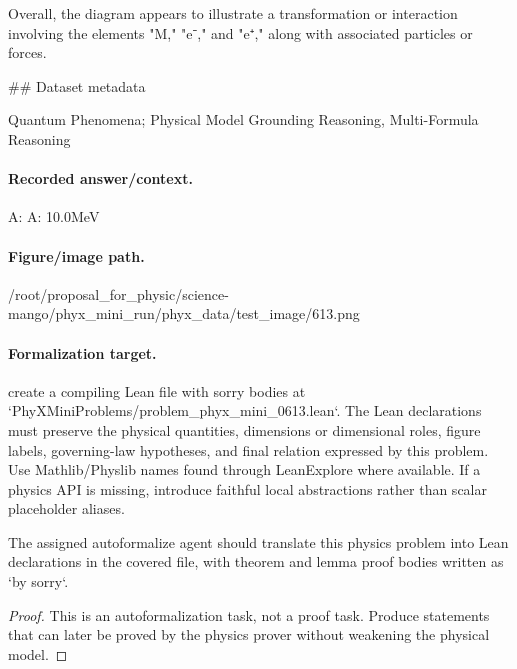 Overall, the diagram appears to illustrate a transformation or interaction involving the elements "M," "e⁻," and "e⁺," along with associated particles or forces.

\#\# Dataset metadata

Quantum Phenomena; Physical Model Grounding Reasoning, Multi-Formula Reasoning

\paragraph{Recorded answer/context.}
A: A:  10.0MeV

\paragraph{Figure/image path.}
/root/proposal\_for\_physic/science-mango/phyx\_mini\_run/phyx\_data/test\_image/613.png

\paragraph{Formalization target.}
create a compiling Lean file with sorry bodies at `PhyXMiniProblems/problem\_phyx\_mini\_0613.lean`. The Lean declarations must preserve the physical quantities, dimensions or dimensional roles, figure labels, governing-law hypotheses, and final relation expressed by this problem.
Use Mathlib/Physlib names found through LeanExplore where available. If a physics API is missing, introduce faithful local abstractions rather than scalar placeholder aliases.

\begin{theorem}
\label{thm:physics:phyx_mini_0613:target}
The assigned autoformalize agent should translate this physics problem into Lean declarations in the covered file, with theorem and lemma proof bodies written as `by sorry`.
\end{theorem}
\begin{proof}
This is an autoformalization task, not a proof task. Produce statements that can later be proved by the physics prover without weakening the physical model.
\end{proof}

